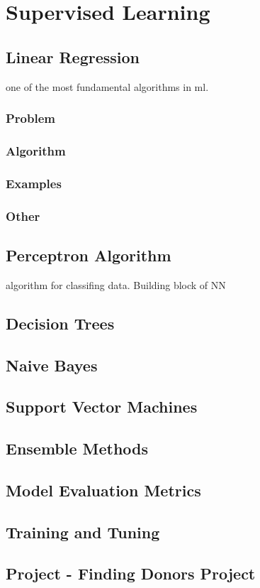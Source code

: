 \chapter{Supervised Learning}
\section{Linear Regression}
one of the most fundamental algorithms in ml.
\subsection*{Problem}

\subsection*{Algorithm}
\subsection*{Examples}
\subsection*{Other}
\section{Perceptron Algorithm}
algorithm for classifing data. Building block of NN
\section{Decision Trees}
\section{Naive Bayes}
\section{Support Vector Machines}
\section{Ensemble Methods}
\section{Model Evaluation Metrics}
\section{Training and Tuning}
\section{Project - Finding Donors Project}